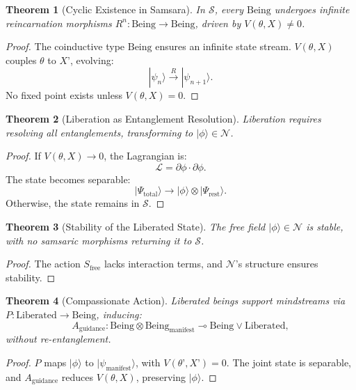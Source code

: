 \documentclass{article}
\newtheorem{theorem}{Theorem}
\begin{document}
\begin{theorem}[Cyclic Existence in Samsara]
\label{thm:cyclic}
In \( \mathcal{S} \), every \( \text{Being} \) undergoes infinite reincarnation morphisms \( R^n: \text{Being} \to \text{Being} \), driven by \( V(\theta, X) \neq 0 \).
\end{theorem}

\begin{proof}
The coinductive type \( \text{Being} \) ensures an infinite state stream. \( V(\theta, X) \) couples \( \theta \) to \( X’ \), evolving:
\[
|\psi_n\rangle \xrightarrow{R} |\psi_{n+1}\rangle.
\]
No fixed point exists unless \( V(\theta, X) = 0 \).
\end{proof}

\begin{theorem}[Liberation as Entanglement Resolution]
\label{thm:liberation}
Liberation requires resolving all entanglements, transforming to \( |\phi\rangle \in \mathcal{N} \).
\end{theorem}

\begin{proof}
If \( V(\theta, X) \to 0 \), the Lagrangian is:
\[
\mathcal{L} = \partial \phi \cdot \partial \phi.
\]
The state becomes separable:
\[
|\Psi_{\text{total}}\rangle \to |\phi\rangle \otimes |\Psi_{\text{rest}}\rangle.
\]
Otherwise, the state remains in \( \mathcal{S} \).
\end{proof}

\begin{theorem}[Stability of the Liberated State]
\label{thm:stability}
The free field \( |\phi\rangle \in \mathcal{N} \) is stable, with no samsaric morphisms returning it to \( \mathcal{S} \).
\end{theorem}

\begin{proof}
The action \( S_{\text{free}} \) lacks interaction terms, and \( \mathcal{N} \)’s structure ensures stability.
\end{proof}

\begin{theorem}[Compassionate Action]
\label{thm:compassion}
Liberated beings support mindstreams via \( P: \text{Liberated} \to \text{Being} \), inducing:
\[
A_{\text{guidance}} : \text{Being} \otimes \text{Being}_{\text{manifest}} \multimap \text{Being} \lor \text{Liberated},
\]
without re-entanglement.
\end{theorem}

\begin{proof}
\( P \) maps \( |\phi\rangle \) to \( |\psi_{\text{manifest}}\rangle \), with \( V(\theta’, X’) = 0 \). The joint state is separable, and \( A_{\text{guidance}} \) reduces \( V(\theta, X) \), preserving \( |\phi\rangle \).
\end{proof}
\end{document}
